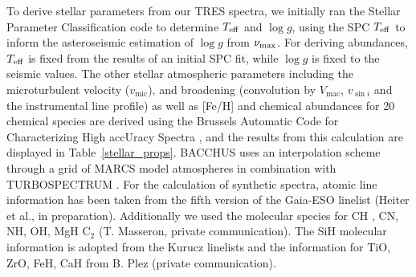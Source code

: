 \documentclass[a4paper,fleqn,usenatbib]{mnras}
\newcommand{\numax}{\mbox{$\nu_{\rm max}$}\xspace}
\newcommand{\teff}{\mbox{$T_{\rm eff}$}\xspace}
\newcommand{\logg}{\mbox{$\log g$}\xspace}
\begin{document}
To derive stellar parameters from our TRES spectra, we initially ran the Stellar Parameter Classification \citep[SPC:][]{spc} code to determine \teff and \logg, using the SPC \teff to inform the asteroseismic estimation of \logg from \numax. For deriving abundances, \teff is fixed from the results of an initial SPC fit, while \logg is fixed to the seismic values. The other stellar atmospheric parameters including the microturbulent velocity ($v_{\text{mic}}$), and broadening (convolution by $V_{\text{mac}}$, $v_{\sin{i}}$ and the instrumental line profile) as well as [Fe/H] and chemical abundances for 20 chemical species are derived using the Brussels Automatic Code for Characterizing High accUracy Spectra \citep[BACCHUS:][]{bacchus}, and the results from this calculation are displayed in Table~\ref{stellar_props}. BACCHUS uses an interpolation scheme through a grid of MARCS model atmospheres \citep{Gustafsson2008} in combination with TURBOSPECTRUM \citep{Alvarez1998, Plez2012}. For the calculation of synthetic spectra, atomic line information has been taken from the fifth version of the Gaia-ESO linelist (Heiter et al., in preparation). Additionally we used the molecular species for CH \citep{Masseron2014}, CN, NH, OH, MgH  C$_{2}$ (T. Masseron, private communication). The SiH molecular information is adopted from the Kurucz linelists and the information for TiO, ZrO, FeH, CaH from B. Plez (private communication). 
\end{document}
